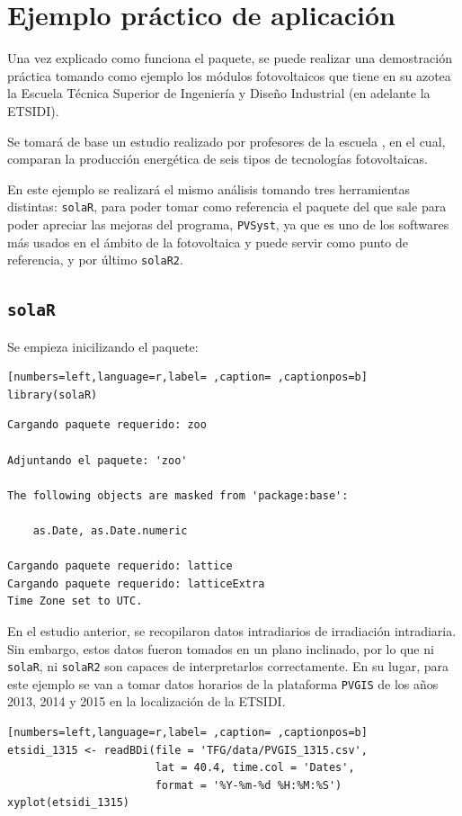 \chapter{Ejemplo práctico de aplicación}
\label{chap:ejemplo-practico-aplicacion}
Una vez explicado como funciona el paquete, se puede realizar una demostración práctica tomando como ejemplo los módulos fotovoltaicos que tiene en su azotea la Escuela Técnica Superior de Ingeniería y Diseño Industrial (en adelante la ETSIDI).

Se tomará de base un estudio realizado por profesores de la escuela \cite{adrada17}, en el cual, comparan la producción energética de seis tipos de tecnologías fotovoltaicas.

En este ejemplo se realizará el mismo análisis tomando tres herramientas distintas: \texttt{solaR}, para poder tomar como referencia el paquete del que sale para poder apreciar las mejoras del programa, \texttt{PVSyst}, ya que es uno de los softwares más usados en el ámbito de la fotovoltaica y puede servir como punto de referencia, y por último \texttt{solaR2}.

\section{\texttt{solaR}}
\label{sec:org0112fbf}
\label{sec:solaR}
Se empieza inicilizando el paquete:
\begin{lstlisting}[numbers=left,language=r,label= ,caption= ,captionpos=b]
library(solaR)
\end{lstlisting}

\begin{verbatim}
Cargando paquete requerido: zoo

Adjuntando el paquete: 'zoo'

The following objects are masked from 'package:base':

    as.Date, as.Date.numeric

Cargando paquete requerido: lattice
Cargando paquete requerido: latticeExtra
Time Zone set to UTC.
\end{verbatim}

En el estudio anterior, se recopilaron datos intradiarios de irradiación intradiaria. Sin embargo, estos datos fueron tomados en un plano inclinado, por lo que ni \texttt{solaR}, ni \texttt{solaR2} son capaces de interpretarlos correctamente. En su lugar, para este ejemplo se van a tomar datos horarios de la plataforma \texttt{PVGIS} \cite{pvgis} de los años 2013, 2014 y 2015 en la localización de la ETSIDI.
\begin{lstlisting}[numbers=left,language=r,label= ,caption= ,captionpos=b]
etsidi_1315 <- readBDi(file = 'TFG/data/PVGIS_1315.csv',
                       lat = 40.4, time.col = 'Dates',
                       format = '%Y-%m-%d %H:%M:%S')
xyplot(etsidi_1315)
\end{lstlisting}

